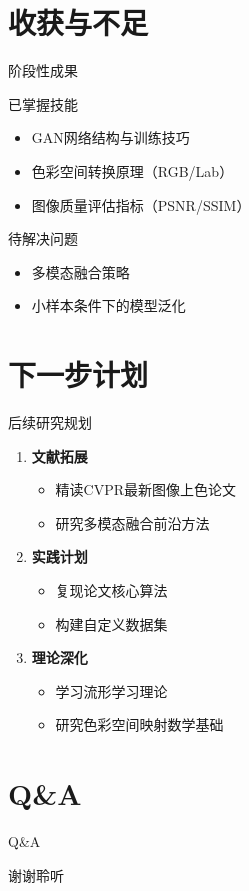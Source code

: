 \documentclass[aspectratio=169,AutoFakeBold]{beamer}
\begin{document}
\section{收获与不足}
\begin{frame}{阶段性成果}
    \begin{textbox}{已掌握技能}
        \begin{itemize}
            \item GAN网络结构与训练技巧
            \item 色彩空间转换原理（RGB/Lab）
            \item 图像质量评估指标（PSNR/SSIM）
        \end{itemize}
    \end{textbox}
    
    \begin{textbox}{待解决问题}
        \begin{itemize}
            \item 多模态融合策略
            \item 小样本条件下的模型泛化
        \end{itemize} 
    \end{textbox}
\end{frame}

\section{下一步计划}
\begin{frame}{后续研究规划}
    \begin{enumerate}
        \item \textbf{文献拓展}
            \begin{itemize}
                \item 精读CVPR最新图像上色论文
                \item 研究多模态融合前沿方法
            \end{itemize}
        \item \textbf{实践计划}
            \begin{itemize}
                \item 复现论文核心算法
                \item 构建自定义数据集
            \end{itemize}
        \item \textbf{理论深化}
            \begin{itemize}
                \item 学习流形学习理论
                \item 研究色彩空间映射数学基础
            \end{itemize}
    \end{enumerate}
\end{frame}


\section{Q\&A}
\begin{frame}{Q\&A}
    
\end{frame}

\begin{frame}
    \Background
    \begin{center}
        {\Huge\calligra 谢谢聆听}
    \end{center}
\end{frame}
\end{document}
